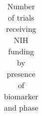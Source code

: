 
\begin{table}[htbp]\centering
\caption{Number of trials receiving NIH funding by presence of biomarker and phase}
\begin{tabular}{l*{5}{c}}
\hline\hline



\hline\hline
\end{tabular}
\end{table}
